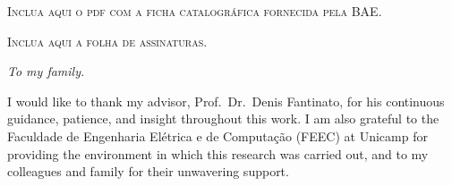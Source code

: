 


\makeindex



\frenchspacing


\imprimircapa

\imprimirfolhaderosto

\begin{fichacatalografica}
    \vspace*{\fill}
    \begin{center}
        \textsc{Inclua aqui o pdf com a ficha catalogr\'{a}fica fornecida pela BAE.}
    \end{center}
    \vspace*{\fill}
\end{fichacatalografica}

\newpage
\vspace*{\fill}
\begin{center}
    \textsc{Inclua aqui a folha de assinaturas.}
\end{center}
\vspace*{\fill}
\newpage
%
\cleardoublepage

\begin{dedicatoria}
    \vspace*{\fill}
    \centering
    \noindent
    \textit{To my family.}
    \vspace*{\fill}
\end{dedicatoria}

\begin{agradecimentos}
    I would like to thank my advisor, Prof.\ Dr.\ Denis Fantinato, for his
    continuous guidance, patience, and insight throughout this work. I am also
    grateful to the Faculdade de Engenharia El\'{e}trica e de Computa\c{c}\~{a}o
    (FEEC) at Unicamp for providing the environment in which this research
    was carried out, and to my colleagues and family for their unwavering
    support.
\end{agradecimentos}

